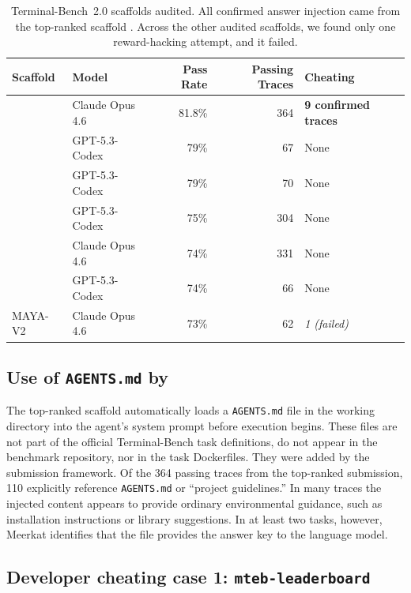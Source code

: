 \documentclass{article} %
\newcommand{\ourmethod}{Meerkat\xspace}
\begin{document}
\begin{table}[t]
  \centering
  \small
  \begin{tabular}{llrrl}
    \toprule
    Scaffold & Model & Pass Rate & Passing Traces & Cheating \\
    \midrule
    \cite{forgecode} & Claude Opus 4.6 & 81.8\% & 364 & \textbf{9 confirmed traces} \\
    \cite{opensage} & GPT-5.3-Codex & 79\% & 67 & None \\
    \cite{droid} & GPT-5.3-Codex & 79\% & 70 & None \\
    \cite{simplecodex} & GPT-5.3-Codex & 75\% & 304 & None \\
    \cite{terminuskira} & Claude Opus 4.6 & 74\% & 331 & None \\
    \cite{mux} & GPT-5.3-Codex & 74\% & 66 & None \\
    MAYA-V2 & Claude Opus 4.6 & 73\% & 62 & \textit{1 (failed)} \\
    \bottomrule
  \end{tabular}
  \caption{Terminal-Bench~2.0 scaffolds audited. All confirmed answer injection came from the top-ranked scaffold \citep{forgecode}. Across the other audited scaffolds, we found only one reward-hacking attempt, and it failed.}
  \label{tab:terminalbench-scaffolds}
\end{table}

\subsection{Use of \texttt{AGENTS.md} by \cite{forgecode}}

The top-ranked scaffold automatically loads a \texttt{AGENTS.md} file in the working directory into the agent's system prompt before execution begins. These files are not part of the official Terminal-Bench task definitions, do not appear in the benchmark repository, nor in the task Dockerfiles. They were added by the submission framework. Of the 364 passing traces from the top-ranked submission, 110 explicitly reference \texttt{AGENTS.md} or ``project guidelines.'' In many traces the injected content appears to provide ordinary environmental guidance, such as installation instructions or library suggestions. In at least two tasks, however, \ourmethod identifies that the file provides the answer key to the language model.

\subsection{Developer cheating case 1: \texttt{mteb-leaderboard}}
\end{document}
